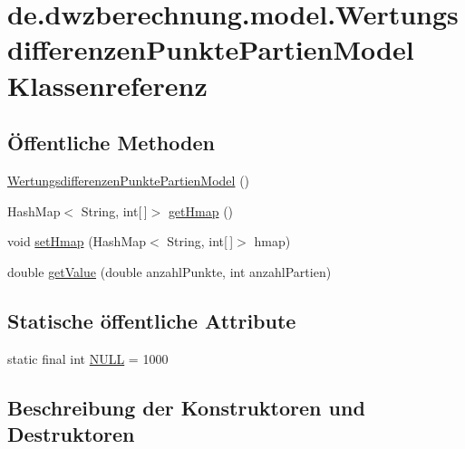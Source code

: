 \hypertarget{classde_1_1dwzberechnung_1_1model_1_1_wertungsdifferenzen_punkte_partien_model}{}\section{de.\+dwzberechnung.\+model.\+Wertungsdifferenzen\+Punkte\+Partien\+Model Klassenreferenz}
\label{classde_1_1dwzberechnung_1_1model_1_1_wertungsdifferenzen_punkte_partien_model}
\subsection*{Öffentliche Methoden}
\begin{DoxyCompactItemize}
\item 
\hyperlink{classde_1_1dwzberechnung_1_1model_1_1_wertungsdifferenzen_punkte_partien_model_a2aacb79ce3aa2d77f1463abd6f2a7364}{Wertungsdifferenzen\+Punkte\+Partien\+Model} ()
\item 
Hash\+Map$<$ String, int\mbox{[}$\,$\mbox{]}$>$ \hyperlink{classde_1_1dwzberechnung_1_1model_1_1_wertungsdifferenzen_punkte_partien_model_a9b9bef6b38e5b16204c699109076000f}{get\+Hmap} ()
\item 
void \hyperlink{classde_1_1dwzberechnung_1_1model_1_1_wertungsdifferenzen_punkte_partien_model_a9f1665a9c2c3ce2b698f7d209dd76413}{set\+Hmap} (Hash\+Map$<$ String, int\mbox{[}$\,$\mbox{]}$>$ hmap)
\item 
double \hyperlink{classde_1_1dwzberechnung_1_1model_1_1_wertungsdifferenzen_punkte_partien_model_a94414effbfd31ce3af3bd04918d7eb75}{get\+Value} (double anzahl\+Punkte, int anzahl\+Partien)
\end{DoxyCompactItemize}
\subsection*{Statische öffentliche Attribute}
\begin{DoxyCompactItemize}
\item 
static final int \hyperlink{classde_1_1dwzberechnung_1_1model_1_1_wertungsdifferenzen_punkte_partien_model_add5237c444126bf1e5c7a76b59a2a008}{N\+U\+LL} = 1000
\end{DoxyCompactItemize}


\subsection{Beschreibung der Konstruktoren und Destruktoren}
